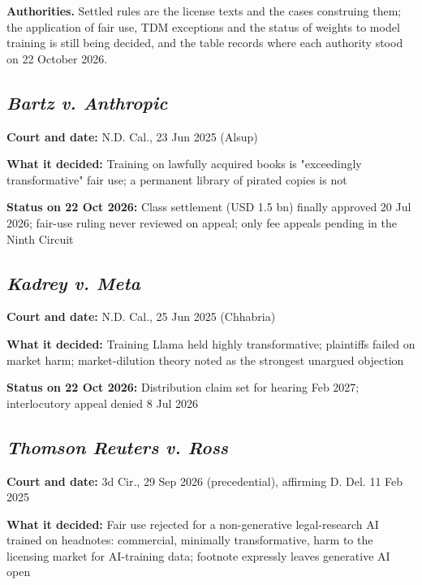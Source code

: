 \documentclass[10pt,a4paper]{article}
\begin{document}
\textbf{Authorities.} Settled rules are the license texts and the cases
construing them; the application of fair use, TDM exceptions and the
status of weights to model training is still being decided, and the
table records where each authority stood on 22 October 2026.

\subsection{\texorpdfstring{\emph{Bartz v.
Anthropic}}{Bartz v. Anthropic}}\label{bartz-v-anthropic}

\textbf{Court and date:} N.D. Cal., 23 Jun 2025 (Alsup)

\textbf{What it decided:} Training on lawfully acquired books is
"exceedingly transformative" fair use; a permanent library of pirated
copies is not

\textbf{Status on 22 Oct 2026:} Class settlement (USD 1.5 bn) finally
approved 20 Jul 2026; fair-use ruling never reviewed on appeal; only fee
appeals pending in the Ninth Circuit

\subsection{\texorpdfstring{\emph{Kadrey v.
Meta}}{Kadrey v. Meta}}\label{kadrey-v-meta}

\textbf{Court and date:} N.D. Cal., 25 Jun 2025 (Chhabria)

\textbf{What it decided:} Training Llama held highly transformative;
plaintiffs failed on market harm; market-dilution theory noted as the
strongest unargued objection

\textbf{Status on 22 Oct 2026:} Distribution claim set for hearing Feb
2027; interlocutory appeal denied 8 Jul 2026

\subsection{\texorpdfstring{\emph{Thomson Reuters v.
Ross}}{Thomson Reuters v. Ross}}\label{thomson-reuters-v-ross}

\textbf{Court and date:} 3d Cir., 29 Sep 2026 (precedential), affirming
D. Del. 11 Feb 2025

\textbf{What it decided:} Fair use rejected for a non-generative
legal-research AI trained on headnotes: commercial, minimally
transformative, harm to the licensing market for AI-training data;
footnote expressly leaves generative AI open
\end{document}
